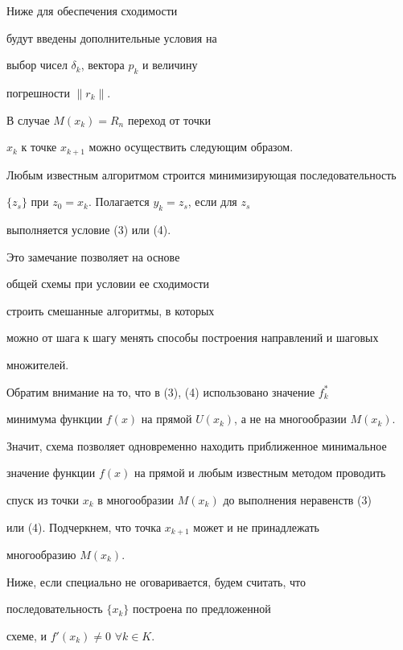Ниже для обеспечения сходимости


будут введены дополнительные условия на


выбор чисел $\delta_k$, вектора $p_k$ и величину


погрешности $\|{r_k} \|$.





В случае $M(x_k)=R_n$ переход от точки


$x_k$ к точке $x_{k+1}$ можно осуществить следующим образом.


Любым известным алгоритмом строится минимизирующая последовательность


$\{z_s\}$ при $z_0=x_k$. Полагается $y_k=z_s$, если для $z_s$


выполняется условие (3) или (4).


Это замечание позволяет на основе


общей схемы при условии ее сходимости


строить смешанные алгоритмы, в которых


можно от шага к шагу менять способы построения направлений и шаговых


множителей.





Обратим внимание на то, что в (3), (4) использовано значение $f^*_k$


минимума функции $f(x)$ на прямой $U(x_k)$, а не на многообразии $M(x_k)$.


Значит, схема позволяет одновременно находить приближенное минимальное


значение функции $f(x)$ на прямой и любым известным методом проводить


спуск из точки $x_k$ в многообразии $M(x_k)$ до выполнения неравенств (3)


или (4). Подчеркнем, что точка $x_{k+1}$ может и не принадлежать


многообразию $M(x_k)$.





Ниже, если специально не оговаривается, будем считать, что


последовательность $\{{x_k} \}$ построена по предложенной


схеме, и ${f}'(x_k)\neq 0$ $\forall k\in K$.






